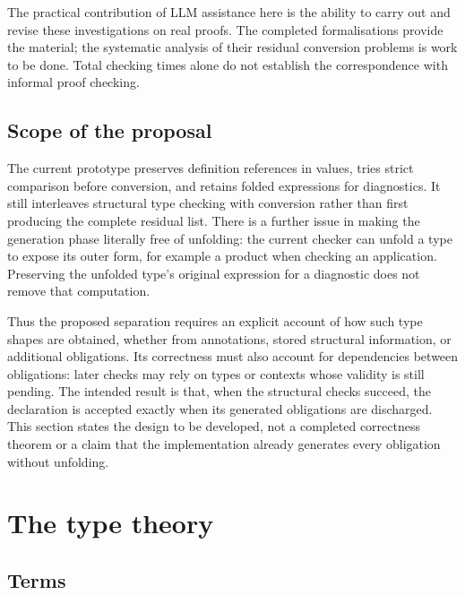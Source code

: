 \documentclass[11pt]{article}
\theoremstyle{remark}
\begin{document}
The practical contribution of LLM assistance here is the ability to
carry out and revise these investigations on real proofs. The completed
formalisations provide the material; the systematic analysis of their
residual conversion problems is work to be done. Total checking times
alone do not establish the correspondence with informal proof checking.

\subsection{Scope of the proposal}\label{sec:obligation-status}

The current prototype preserves definition references in values, tries
strict comparison before conversion, and retains folded expressions for
diagnostics. It still interleaves structural type checking with
conversion rather than first producing the complete residual list.
There is a further issue in making the generation phase literally free
of unfolding: the current checker can unfold a type to expose its outer
form, for example a product when checking an application. Preserving the
unfolded type's original expression for a diagnostic does not remove
that computation.

Thus the proposed separation requires an explicit account of how such
type shapes are obtained, whether from annotations, stored structural
information, or additional obligations. Its correctness must also account
for dependencies between obligations: later checks may rely on types or
contexts whose validity is still pending. The intended result is that,
when the structural checks succeed, the declaration is accepted exactly
when its generated obligations are discharged. This section states the
design to be developed, not a completed correctness theorem or a claim
that the implementation already generates every obligation without
unfolding.

\section{The type theory}\label{sec:tt}

\subsection{Terms}
\end{document}
